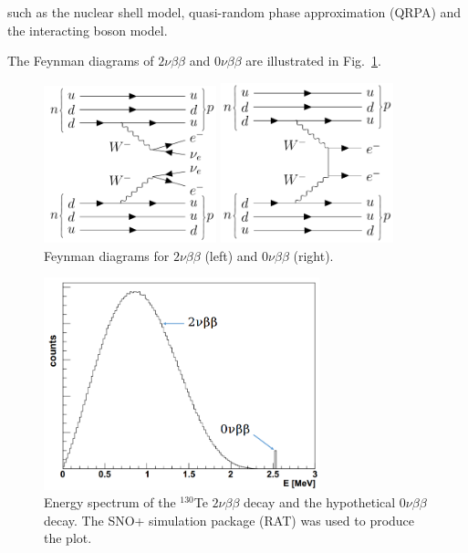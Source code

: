 such as the nuclear shell model, quasi-random phase approximation (QRPA) and 
the interacting boson model.





The Feynman diagrams of $2\nu\beta\beta$ and $0\nu\beta\beta$ are illustrated in Fig.~\ref{feynman1}.

\begin{figure}[htbp]
	\centering	
	\begin{minipage}[t]{0.45\textwidth}
		\includegraphics[width=5cm]{doubleBeta2nu_feynman.png}
	\end{minipage}
	\begin{minipage}[t]{0.45\textwidth}
		\includegraphics[width=5cm]{doubleBeta_feynman.png}
	\end{minipage}
	\caption{ Feynman diagrams for $2\nu\beta\beta$ (left) and $0\nu\beta\beta$ (right).}
	\label{feynman1}
\end{figure}

\begin{figure}[htbp]
	\centering	
	\includegraphics[width=8cm]{Te130_energy0vbb.png}
	\caption{Energy spectrum of the $^{130}$Te $2\nu\beta\beta$ decay and the hypothetical $0\nu\beta\beta$ decay. The SNO+ simulation package (RAT) was used to produce the plot.}
	\label{te130energy}
\end{figure}

